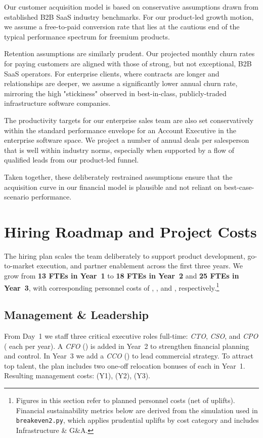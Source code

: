 Our customer acquisition model is based on conservative assumptions drawn from established B2B SaaS industry benchmarks. For our product-led growth motion, we assume a free-to-paid conversion rate that lies at the cautious end of the typical performance spectrum for freemium products.

Retention assumptions are similarly prudent. Our projected monthly churn rates for paying customers are aligned with those of strong, but not exceptional, B2B SaaS operators. For enterprise clients, where contracts are longer and relationships are deeper, we assume a significantly lower annual churn rate, mirroring the high "stickiness" observed in best-in-class, publicly-traded infrastructure software companies.

The productivity targets for our enterprise sales team are also set conservatively within the standard performance envelope for an Account Executive in the enterprise software space. We project a number of annual deals per salesperson that is well within industry norms, especially when supported by a flow of qualified leads from our product-led funnel.

Taken together, these deliberately restrained assumptions ensure that the acquisition curve in our financial model is plausible and not reliant on best-case-scenario performance.

\newpage
\section{Hiring Roadmap and Project Costs}
\label{sec:hiring-roadmap}

The hiring plan scales the team deliberately to support product development, go-to-market execution, and partner enablement across the first three years. We grow from \textbf{13 FTEs in Year~1} to \textbf{18 FTEs in Year~2} and \textbf{25 FTEs in Year~3}, with corresponding personnel costs of \textbf{}, \textbf{}, and \textbf{}, respectively.\footnote{Figures in this section refer to planned personnel costs (net of uplifts). Financial sustainability metrics below are derived from the simulation used in \texttt{breakeven2.py}, which applies prudential uplifts by cost category and includes Infrastructure \& G\&A.}

\subsection{Management \& Leadership}
From Day~1 we staff three critical executive roles full-time: \textit{CTO}, \textit{CSO}, and \textit{CPO} ( each per year). A \textit{CFO} () is added in Year~2 to strengthen financial planning and control. In Year~3 we add a \textit{CCO} () to lead commercial strategy. To attract top talent, the plan includes two one-off relocation bonuses of  each in Year~1. Resulting management costs: \textbf{} (Y1), \textbf{} (Y2), \textbf{} (Y3).

